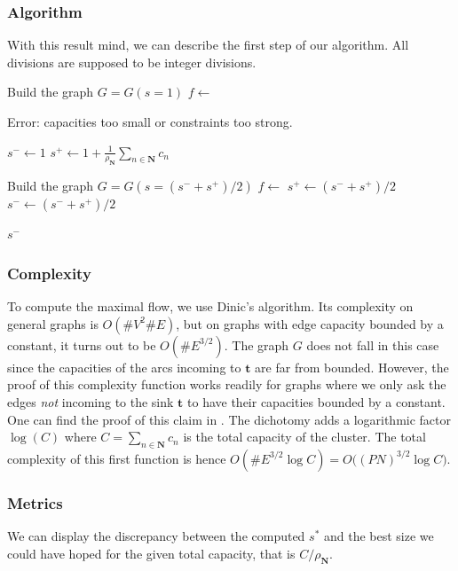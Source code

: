 \documentclass[]{article}
\begin{document}
\subsubsection*{Algorithm}
With this result mind, we can describe the first step of our algorithm. All divisions are supposed to be integer divisions.
\begin{algorithmic}[1]
	
	\State Build the graph $G=G(s=1)$
	\State $ f \leftarrow$ 
	
	\State \Return Error: capacities too small or constraints too strong.
	\EndIf
	
	\State $s^- \leftarrow 1$
	\State $s^+ \leftarrow 1+\frac{1}{\rho_\mathbf{N}}\sum_{n \in \mathbf{N}} c_n$
	
	\State Build the graph $G=G(s=(s^-+s^+)/2)$
	\State $ f \leftarrow$ 
	\State $s^+ \leftarrow (s^- + s^+)/2$
	\Else
	\State $s^- \leftarrow (s^- + s^+)/2$
	\EndIf
	\EndWhile
	
	\State \Return $s^-$
	\EndFunction
\end{algorithmic}

\subsubsection*{Complexity}

To compute the maximal flow, we use Dinic's algorithm. Its complexity on general graphs is $O(\#V^2 \#E)$, but on graphs with edge capacity bounded by a constant, it turns out to be $O(\#E^{3/2})$. The graph $G$ does not fall in this case since the capacities of the arcs incoming to $\mathbf{t}$ are far from bounded. However, the proof of this complexity function works readily for graphs where we only ask the edges \emph{not} incoming to the sink $\mathbf{t}$ to have their capacities bounded by a constant. One can find the proof of this claim in \cite[Section 2]{even1975network}.
The dichotomy adds a logarithmic factor $\log (C)$ where $C=\sum_{n \in \mathbf{N}} c_n$ is the total capacity of the cluster. The total complexity of this first function is hence 
$O(\#E^{3/2}\log C ) = O\big((PN)^{3/2} \log C\big)$.

\subsubsection*{Metrics}
We can display the discrepancy between the computed $s^*$ and the best size we could have hoped for the given total capacity, that is $C/\rho_\mathbf{N}$.
\end{document}

